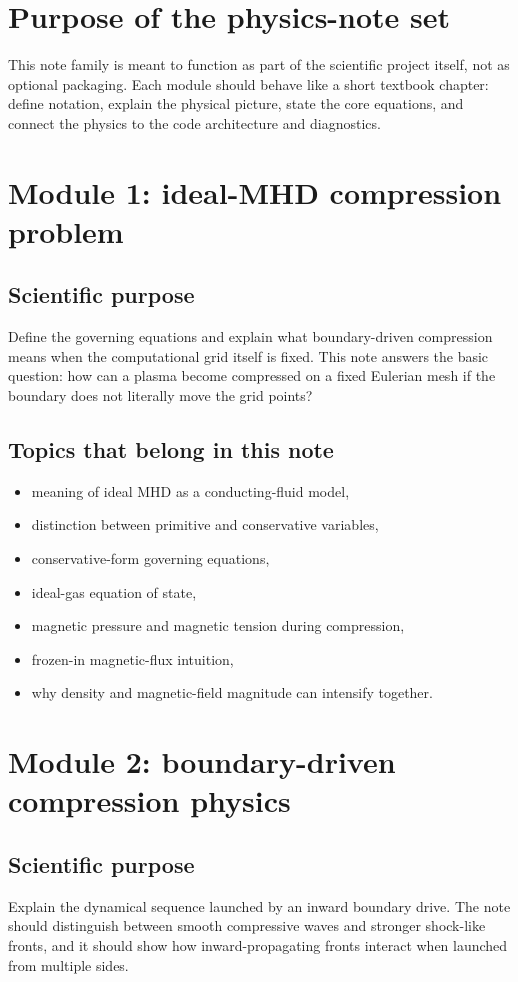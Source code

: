 \documentclass[11pt]{article}
\begin{document}
\section{Purpose of the physics-note set}
This note family is meant to function as part of the scientific project itself, not as optional packaging. Each module should behave like a short textbook chapter: define notation, explain the physical picture, state the core equations, and connect the physics to the code architecture and diagnostics.

\section{Module 1: ideal-MHD compression problem}
\subsection{Scientific purpose}
Define the governing equations and explain what boundary-driven compression means when the computational grid itself is fixed. This note answers the basic question: how can a plasma become compressed on a fixed Eulerian mesh if the boundary does not literally move the grid points?

\subsection{Topics that belong in this note}
\begin{itemize}[leftmargin=1.8em]
    \item meaning of ideal MHD as a conducting-fluid model,
    \item distinction between primitive and conservative variables,
    \item conservative-form governing equations,
    \item ideal-gas equation of state,
    \item magnetic pressure and magnetic tension during compression,
    \item frozen-in magnetic-flux intuition,
    \item why density and magnetic-field magnitude can intensify together.
\end{itemize}

\section{Module 2: boundary-driven compression physics}
\subsection{Scientific purpose}
Explain the dynamical sequence launched by an inward boundary drive. The note should distinguish between smooth compressive waves and stronger shock-like fronts, and it should show how inward-propagating fronts interact when launched from multiple sides.
\end{document}
